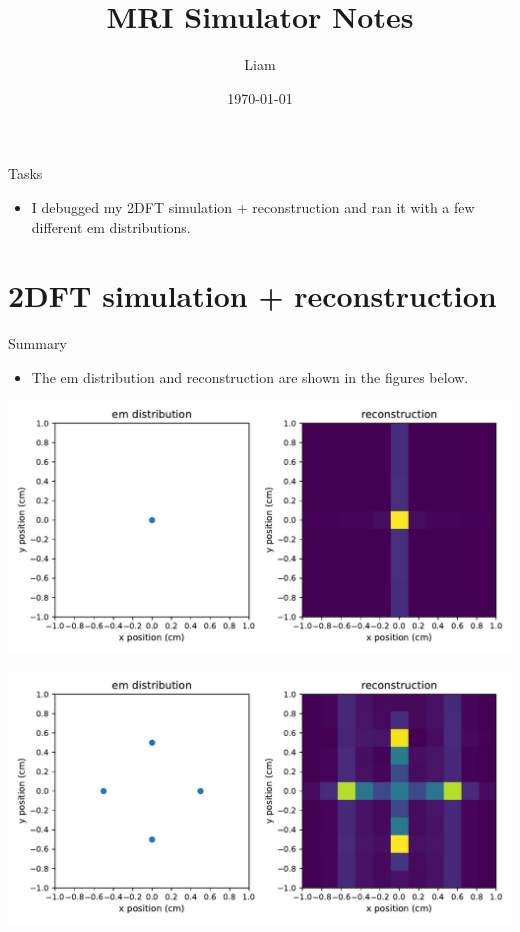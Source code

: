 \documentclass[dvipsnames]{beamer}
\title{MRI Simulator Notes}
\author{Liam}
\date{\today}
\begin{document}
\begin{frame}
\maketitle
\end{frame}

\begin{frame}{Tasks}
\begin{itemize}
\item I debugged my 2DFT simulation + reconstruction and ran it with a few different em distributions.
\end{itemize}
\end{frame}

\section{2DFT simulation + reconstruction}

\begin{frame}{Summary}
\begin{itemize}
\item The em distribution and reconstruction are shown in the figures below.
\end{itemize}
\end{frame}

\begin{frame}
\begin{center}
\includegraphics[width=\textwidth]{reconstruction_ems-origin}
\end{center}
\end{frame}

\begin{frame}
\begin{center}
\includegraphics[width=\textwidth]{reconstruction_ems-star}
\end{center}
\end{frame}
\end{document}
